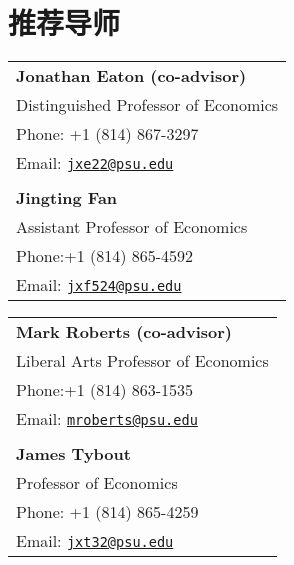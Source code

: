 \documentclass[letterpaper]{article}
\begin{document}

\section*{\textsc{推荐导师}}
\begin{minipage}{0.5\linewidth}
    \begin{tabular}{l}
        \textbf{Jonathan Eaton (co-advisor)}  \\
         Distinguished Professor of Economics \\
         Phone: +1 (814) 867-3297 \\
         Email: \href{mailto:jxe22@psu.edu}{\tt jxe22@psu.edu}\\
           \\
         \textbf{Jingting Fan}\\
         Assistant Professor of Economics  \\
         Phone:+1 (814) 865-4592 \\
         Email: \href{mailto:jxf524@psu.edu}{\tt jxf524@psu.edu} 
    \end{tabular}
\end{minipage}
\begin{minipage}{0.5\linewidth}
    \begin{tabular}{l}
   \textbf{Mark Roberts (co-advisor)} \\
     Liberal Arts Professor of Economics\\
 Phone:+1 (814) 863-1535 \\
 Email: \href{mailto:mroberts@psu.edu}{\tt mroberts@psu.edu}  \\
\\
   \textbf{James Tybout}  \\
Professor of Economics     \\
Phone: +1 (814) 865-4259  \\
Email: \href{mailto:jxt32@psu.edu}{\tt jxt32@psu.edu}
    \end{tabular}
\end{minipage}
\end{document}
